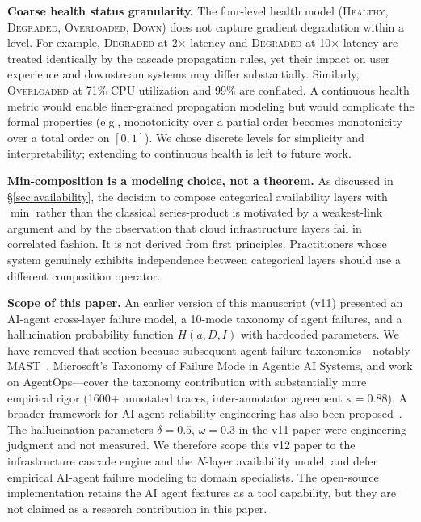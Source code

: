 \documentclass[10pt,twocolumn]{article}
\begin{document}
\textbf{Coarse health status granularity.}
The four-level health model (\textsc{Healthy}, \textsc{Degraded},
\textsc{Overloaded}, \textsc{Down}) does not capture gradient
degradation within a level. For example, \textsc{Degraded} at
2$\times$ latency and \textsc{Degraded} at 10$\times$ latency are
treated identically by the cascade propagation rules, yet their
impact on user experience and downstream systems may differ
substantially. Similarly, \textsc{Overloaded} at 71\% CPU
utilization and 99\% are conflated. A continuous health metric
would enable finer-grained propagation modeling but would
complicate the formal properties (e.g., monotonicity over a
partial order becomes monotonicity over a total order on
$[0, 1]$). We chose discrete levels for simplicity and
interpretability; extending to continuous health is left to
future work.

\textbf{Min-composition is a modeling choice, not a theorem.}
As discussed in \S\ref{sec:availability}, the decision to compose
categorical availability layers with $\min$ rather than the classical
series-product is motivated by a weakest-link argument and by the
observation that cloud infrastructure layers fail in correlated
fashion. It is not derived from first principles. Practitioners whose
system genuinely exhibits independence between categorical layers
should use a different composition operator.

\textbf{Scope of this paper.}
An earlier version of this manuscript (v11) presented an AI-agent
cross-layer failure model, a 10-mode taxonomy of agent failures,
and a hallucination probability function $H(a, D, I)$ with
hardcoded parameters. We have removed that section because
subsequent agent failure taxonomies---notably
MAST~\cite{cemri2025mast}, Microsoft's Taxonomy of Failure Mode in
Agentic AI Systems, and work on AgentOps---cover the taxonomy
contribution with substantially more empirical rigor (1600+
annotated traces, inter-annotator agreement $\kappa = 0.88$).
A broader framework for AI agent reliability engineering has also
been proposed~\cite{airel2026}.
The
hallucination parameters $\delta = 0.5$, $\omega = 0.3$ in the v11
paper were engineering judgment and not measured. We therefore
scope this v12 paper to the infrastructure cascade engine and the
$N$-layer availability model, and defer empirical AI-agent failure
modeling to domain specialists. The open-source implementation
retains the AI agent features as a tool capability, but they are
not claimed as a research contribution in this paper.
\end{document}
